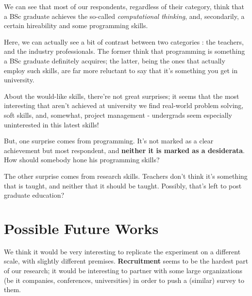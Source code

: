 \documentclass{sigchi}
\begin{document}
We can see that most of our respondents, regardless of their category, think that a BSc graduate achieves the so-called \textit{computational thinking}, and, secondarily, a certain hireability and some programming skills. 

Here, we can actually see a bit of contrast between two categories : the teachers, and the industry professionals. The former think that programming is something a BSc graduate definitely acquires; the latter, being the ones that actually employ such skills, are far more reluctant to say that it's something you get in university.

About the would-like skills, there're not great surprises; it seems that the most interesting that aren't achieved at university we find real-world problem solving, soft skills, and, somewhat, project management - undergrads seem especially uninterested in this latest skills!

But, one surprise comes from programming. It's not marked as a clear achievement but most respondent, and \textbf{neither it is marked as a desiderata}. How should somebody hone his programming skills?

The other surprise comes from research skills. Teachers don't think it's something that is taught, and neither that it should be taught. Possibly, that's left to post graduate education?



\section{Possible Future Works}
We think it would be very interesting to replicate the experiment on a different scale, with slightly different premises. \textbf{Recruitment} seems to be the hardest part of our research; it would be interesting to partner with some large organizations (be it companies, conferences, universities) in order to push a (similar) survey to them.\newline






\balance{}

\balance{}



\end{document}
